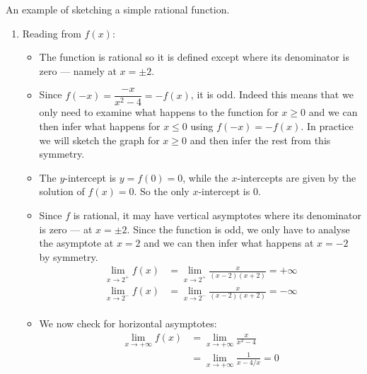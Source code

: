 An example of sketching a simple rational function.
\begin{eg}[$f(x) = \dfrac{x}{x^2-4}$]\label{eg_3_6_6}
\begin{enumerate}[(1)]
\item Reading from $f(x)$:
\begin{itemize}
 \item The function is rational so it is defined except where its denominator
is zero --- namely at $x=\pm2$.

\item Since $f(-x) = \dfrac{-x}{x^2-4} = - f(x)$, it is odd. Indeed this means
that we only need to examine what happens to the function for $x \geq 0$ and we
can then infer what happens for $x\leq 0$ using $f(-x) = -f(x)$. In
practice we will sketch the graph for $x\geq0$ and then infer the rest
from this symmetry.

\item The $y$-intercept is $y=f(0)=0$, while the $x$-intercepts are given by
the solution of $f(x)=0$. So the only $x$-intercept is $0$.

\item Since $f$ is rational, it may have vertical asymptotes where its
denominator is zero --- at $x=\pm 2$. Since the function is odd, we only have
to analyse the asymptote at $x=2$ and we can then infer what happens at $x=-2$
by symmetry.
\begin{align*}
  \lim_{x\to 2^+} f(x)
  &= \lim_{x\to 2^+} \frac{x}{(x-2)(x+2)} = + \infty \\
  \lim_{x\to 2^-} f(x) &=
  \lim_{x\to 2^-} \frac{x}{(x-2)(x+2)} = - \infty \\
\end{align*}

\item We now check for horizontal asymptotes:
\begin{align*}
\lim_{x\to +\infty} f(x)
&= \lim_{x\to +\infty} \frac{x}{x^2-4} \\
&= \lim_{x\to +\infty} \frac{1}{x-4/x} = 0
\end{align*}
\end{itemize}



\end{enumerate}
\end{eg}
